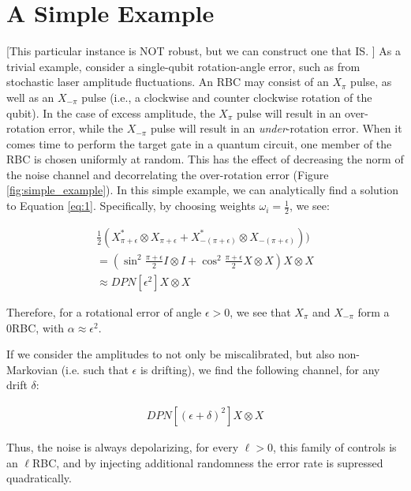 \documentclass[aps,nofootinbib,pra,notitlepage,twocolumn]{revtex4-1}
\newcommand{\note}[1]{{\color{red}[#1]}}
\begin{document}
\section{A Simple Example}
\note{This particular instance is NOT robust, but we can construct one that IS. }
As a trivial example, consider a single-qubit rotation-angle error, such as from stochastic laser amplitude fluctuations. An RBC may consist of an $X_\pi$ pulse, as well as an $X_{-\pi}$ pulse (i.e., a clockwise and counter clockwise rotation of the qubit). In the case of excess amplitude, the $X_\pi$ pulse will result in an over-rotation error, while the $X_{-\pi}$ pulse will result in an \emph{under}-rotation error. When it comes time to perform the target gate in a quantum circuit, one member of the RBC is chosen uniformly at random. This has the effect of decreasing the norm of the noise channel and decorrelating the over-rotation error (Figure \ref{fig:simple_example}). In this simple example, we can analytically find a solution to Equation \ref{eq:1}. Specifically, by choosing weights $\omega_i=\frac{1}{2}$, we see:

\begin{equation}
  \begin{gathered}
    \frac{1}{2}(X^*_{\pi + \epsilon}\otimes X_{\pi + \epsilon} + X^*_{-(\pi + \epsilon)}\otimes X_{-(\pi + \epsilon)})) \\
    = (\sin^2{\frac{\pi + \epsilon}{2}}I\otimes I + \cos^2{\frac{\pi + \epsilon}{2}}X\otimes X)X\otimes X \\
    \approx DPN[\epsilon^2]X\otimes X
  \end{gathered}
\end{equation}

Therefore, for a rotational error of angle $\epsilon > 0$, we see that $X_\pi$ and  $X_{-\pi}$  form a 0RBC, with $\alpha\approx\epsilon^2$.

If we consider the amplitudes to not only be miscalibrated, but also non-Markovian (i.e. such that $\epsilon$ is drifting), we find the following channel, for any drift $\delta$:

\begin{equation}
  \begin{gathered}
  DPN[(\epsilon + \delta)^2]X\otimes X
  \end{gathered}
\end{equation}

Thus, the noise is always depolarizing, for every $\ell > 0$, this family of controls is an $\ell$RBC, and by injecting additional randomness the error rate is supressed quadratically.
\end{document}
